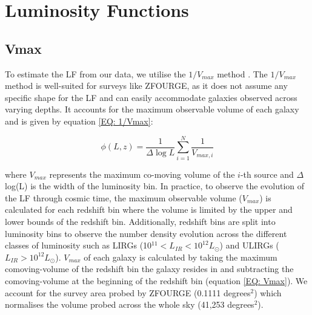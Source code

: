 \section{Luminosity Functions} \label{Sec: Luminosity Functions}
\subsection{Vmax}
To estimate the LF from our data, we utilise the $1/V_{max}$ method \citep{schmidt_space_1968}. The $1/V_{max}$ method is well-suited for surveys like ZFOURGE, as it does not assume any specific shape for the LF and can easily accommodate galaxies observed across varying depths. It accounts for the maximum observable volume of each galaxy and is given by equation \ref{EQ: 1/Vmax}:

\begin{equation} \label{EQ: 1/Vmax}
    \phi(L,z) = \frac{1}{\Delta \log L}\sum_{i=1}^N \frac{1}{V_{max,i}}
\end{equation}

where $V_{max}$ represents the maximum co-moving volume of the $i$-th source and $\Delta$ log(L) is the width of the luminosity bin. In practice, to observe the evolution of the LF through cosmic time, the maximum observable volume ($V_{max}$) is calculated for each redshift bin where the volume is limited by the upper and lower bounds of the redshift bin. Additionally, redshift bins are split into luminosity bins to observe the number density evolution across the different classes of luminosity such as LIRGs (10$^{11} < L_{IR} < 10^{12} L_{\odot}$) and ULIRGs ($L_{IR} > 10^{12} L_{\odot}$). $V_{max}$ of each galaxy is calculated by taking the maximum comoving-volume of the redshift bin the galaxy resides in and subtracting the comoving-volume at the beginning of the redshift bin (equation \ref{EQ: Vmax}). We account for the survey area probed by ZFOURGE (0.1111 degrees$^2$) which normalises the volume probed across the whole sky (41,253 degrees$^2$). 

